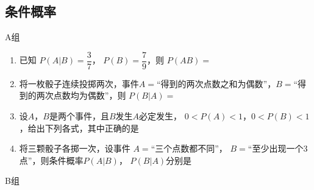 \subsection*{条件概率}

A组


\begin{enumerate}

\item 已知 $P(A|B)=\dfrac{3}{7}$， $P(B)=\dfrac{7}{9}$，则 $P(AB)=$

\item 将一枚骰子连续投掷两次，事件$A=$“得到的两次点数之和为偶数”，$B=$“得到的两次点数均为偶数”，则 $P(B|A)=$

\item 设$A$，$B$是两个事件，且$B$发生$A$必定发生， $0<P(A)<1$，$0<P(B)<1$，给出下列各式，其中正确的是

\item 将三颗骰子各掷一次，设事件 $A=$“三个点数都不同”， $B=$“至少出现一个$3$点”，则条件概率$P(A|B)$， $P(B|A)$分别是

\end{enumerate}

B组

